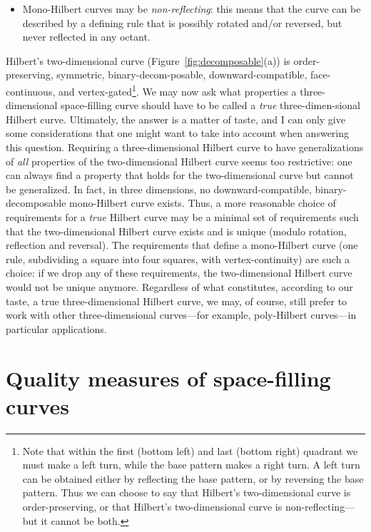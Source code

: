 \documentclass[11pt,a4paper]{article}
\begin{document}
\begin{itemize}
\item Mono-Hilbert curves may be \emph{non-reflecting}: this means that the curve can be described by a defining rule that is possibly rotated and/or reversed, but never reflected in any octant.
\end{itemize}

Hilbert's two-dimensional curve (Figure~\ref{fig:decomposable}(a)) is order-preserving, symmetric, binary-decom-posable, downward-compatible, face-continuous, and vertex-gated\footnote{Note that within the first (bottom left) and last (bottom right) quadrant we must make a left turn, while the base pattern makes a right turn. A left turn can be obtained either by reflecting the base pattern, or by reversing the base pattern. Thus we can choose to say that Hilbert's two-dimensional curve is order-preserving, or that Hilbert's two-dimensional curve is non-reflecting---but it cannot be both.}. We may now ask what properties a three-dimensional space-filling curve should have to be called a \emph{true} three-dimen-sional Hilbert curve. Ultimately, the answer is a matter of taste, and I can only give some considerations that one might want to take into account when answering this question. Requiring a three-dimensional Hilbert curve to have generalizations of \emph{all} properties of the two-dimensional Hilbert curve seems too restrictive: one can always find a property that holds for the two-dimensional curve but cannot be generalized. In fact, in three dimensions, no downward-compatible, binary-decomposable mono-Hilbert curve exists. Thus, a more reasonable choice of requirements for a \emph{true} Hilbert curve may be a minimal set of requirements such that the two-dimensional Hilbert curve exists and is unique (modulo rotation, reflection and reversal). The requirements that define a mono-Hilbert curve (one rule, subdividing a square into four squares, with vertex-continuity) are such a choice: if we drop any of these requirements, the two-dimensional Hilbert curve would not be unique anymore. Regardless of what constitutes, according to our taste, a true three-dimensional Hilbert curve, we may, of course, still prefer to work with other three-dimensional curves---for example, poly-Hilbert curves---in particular applications.

\section{Quality measures of space-filling curves}
\label{sec:measures}
\end{document}

